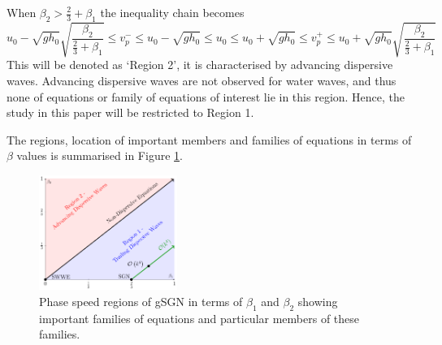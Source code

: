 \documentclass[10pt]{elsarticle}
\begin{document}
When ${\beta_2} > \frac{2}{3} + \beta_1 $ the inequality chain becomes
\begin{equation}
u_0 - \sqrt{gh_0} \sqrt{\dfrac{\beta_2}{\frac{2}{3} + \beta_1}} \le v^-_p \le u_0 -  \sqrt{gh_0} \le  u_0 \le u_0 + \sqrt{gh_0} \le   v^+_p  \le u_0 +  \sqrt{gh_0} \sqrt{\dfrac{\beta_2}{\frac{2}{3} + \beta_1}}
\end{equation}
This will be denoted as `Region 2', it is characterised by advancing dispersive waves. Advancing dispersive waves are not observed for water waves, and thus none of equations or family of equations of interest lie in this region. Hence, the study in this paper will be restricted to Region 1.   

The regions, location of important members and families of equations in terms of $\beta$ values is summarised in Figure \ref{Fig:WaveSpeedReg}.
%
\begin{figure}
	\centering
	\includegraphics[width=0.4\textwidth]{./Figures/Explanation/BetaPlotAll.pdf}
	\caption{Phase speed regions of gSGN in terms of $\beta_1$ and $\beta_2$ showing important families of equations and particular members of these families.}
	\label{Fig:WaveSpeedReg}
\end{figure}


\end{document}
